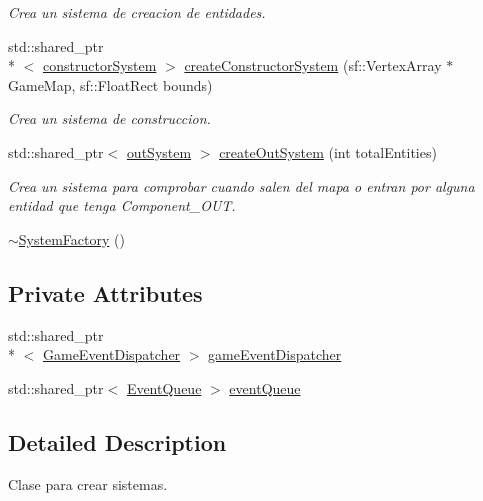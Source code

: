 \begin{DoxyCompactItemize}
\begin{DoxyCompactList}\small\item\em Crea un sistema de creacion de entidades. \end{DoxyCompactList}\item 
std\+::shared\+\_\+ptr\\*
$<$ \hyperlink{classant_1_1constructor_system}{constructor\+System} $>$ \hyperlink{classant_1_1_system_factory_adefb28b61b249e8e50814782c03a9de7}{create\+Constructor\+System} (sf\+::\+Vertex\+Array $\ast$Game\+Map, sf\+::\+Float\+Rect bounds)
\begin{DoxyCompactList}\small\item\em Crea un sistema de construccion. \end{DoxyCompactList}\item 
std\+::shared\+\_\+ptr$<$ \hyperlink{classant_1_1out_system}{out\+System} $>$ \hyperlink{classant_1_1_system_factory_a4334abc153fc1a4dcfcf1452f9371e56}{create\+Out\+System} (int total\+Entities)
\begin{DoxyCompactList}\small\item\em Crea un sistema para comprobar cuando salen del mapa o entran por alguna entidad que tenga Component\+\_\+\+O\+U\+T. \end{DoxyCompactList}\item 
\hyperlink{classant_1_1_system_factory_a702fd13a4c1a4013f37cb6ec43461a19}{$\sim$\+System\+Factory} ()
\end{DoxyCompactItemize}
\subsection*{Private Attributes}
\begin{DoxyCompactItemize}
\item 
std\+::shared\+\_\+ptr\\*
$<$ \hyperlink{classant_1_1_game_event_dispatcher}{Game\+Event\+Dispatcher} $>$ \hyperlink{classant_1_1_system_factory_ac2e43c03f569c09b2ab6a3539e0fc42a}{game\+Event\+Dispatcher}
\item 
std\+::shared\+\_\+ptr$<$ \hyperlink{classant_1_1_event_queue}{Event\+Queue} $>$ \hyperlink{classant_1_1_system_factory_ae72909e917f13c79cf1a44731d473c02}{event\+Queue}
\end{DoxyCompactItemize}


\subsection{Detailed Description}
Clase para crear sistemas. 

